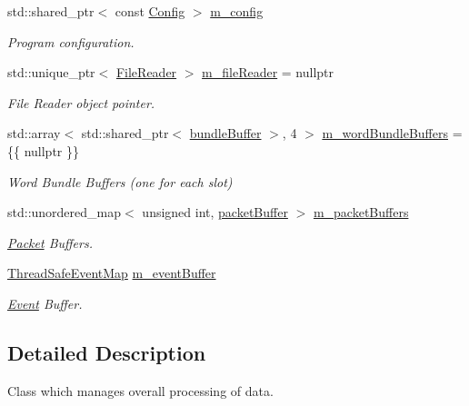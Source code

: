 \begin{DoxyCompactItemize}
\item 
std\+::shared\+\_\+ptr$<$ const \hyperlink{class_config}{Config} $>$ \hyperlink{class_processor_ae6ebab331300f556a5c9b58d3dbfff60}{m\+\_\+config}
\begin{DoxyCompactList}\small\item\em Program configuration. \end{DoxyCompactList}\item 
std\+::unique\+\_\+ptr$<$ \hyperlink{class_file_reader}{File\+Reader} $>$ \hyperlink{class_processor_aafe2ae55e609005c0e88226f1dd1dcb5}{m\+\_\+file\+Reader} = nullptr
\begin{DoxyCompactList}\small\item\em File Reader object pointer. \end{DoxyCompactList}\item 
std\+::array$<$ std\+::shared\+\_\+ptr$<$ \hyperlink{class_processor_a531b4c5f7c0d810fc6e9e1dd3d115725}{bundle\+Buffer} $>$, 4 $>$ \hyperlink{class_processor_a8277cf1524daaa16f0dacfddd02ffd13}{m\+\_\+word\+Bundle\+Buffers} = \{\{ nullptr \}\}
\begin{DoxyCompactList}\small\item\em Word Bundle Buffers (one for each slot) \end{DoxyCompactList}\item 
std\+::unordered\+\_\+map$<$ unsigned int, \hyperlink{class_processor_a0cfd8ed0721769db91c142a19a392e0f}{packet\+Buffer} $>$ \hyperlink{class_processor_ab75c789ec03e38e8621f000332daa285}{m\+\_\+packet\+Buffers}
\begin{DoxyCompactList}\small\item\em \hyperlink{class_packet}{Packet} Buffers. \end{DoxyCompactList}\item 
\hyperlink{class_thread_safe_event_map}{Thread\+Safe\+Event\+Map} \hyperlink{class_processor_a7cb15fbab19fceb6bc5a607629ff5040}{m\+\_\+event\+Buffer}
\begin{DoxyCompactList}\small\item\em \hyperlink{class_event}{Event} Buffer. \end{DoxyCompactList}\end{DoxyCompactItemize}


\subsection{Detailed Description}
Class which manages overall processing of data. 

